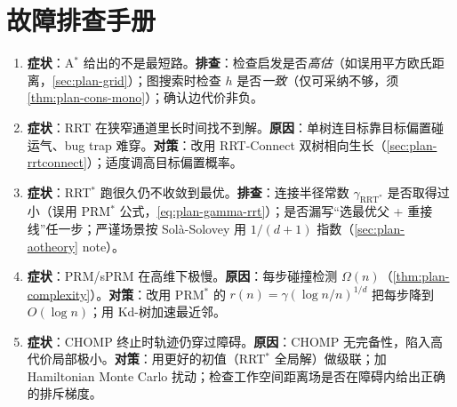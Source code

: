 \section*{故障排查手册}
\begin{enumerate}
  \item \textbf{症状}：A$^*$ 给出的不是最短路。\textbf{排查}：检查启发是否\emph{高估}（如误用平方欧氏距离，\cref{sec:plan-grid}）；图搜索时检查 $h$ 是否\emph{一致}（仅可采纳不够，须 \cref{thm:plan-cons-mono}）；确认边代价非负。
  \item \textbf{症状}：RRT 在狭窄通道里长时间找不到解。\textbf{原因}：单树连目标靠目标偏置碰运气、bug trap 难穿。\textbf{对策}：改用 RRT-Connect 双树相向生长（\cref{sec:plan-rrtconnect}）；适度调高目标偏置概率。
  \item \textbf{症状}：RRT$^*$ 跑很久仍不收敛到最优。\textbf{排查}：连接半径常数 $\gamma_{\mathrm{RRT}^*}$ 是否取得过小（误用 PRM$^*$ 公式，\cref{eq:plan-gamma-rrt}）；是否漏写“选最优父 + 重接线”任一步；严谨场景按 Solà-Solovey 用 $1/(d+1)$ 指数（\cref{sec:plan-aotheory} note）。
  \item \textbf{症状}：PRM/sPRM 在高维下极慢。\textbf{原因}：每步碰撞检测 $\Omega(n)$（\cref{thm:plan-complexity}）。\textbf{对策}：改用 PRM$^*$ 的 $r(n)=\gamma(\log n/n)^{1/d}$ 把每步降到 $O(\log n)$；用 Kd-树加速最近邻。
  \item \textbf{症状}：CHOMP 终止时轨迹仍穿过障碍。\textbf{原因}：CHOMP 无完备性，陷入高代价局部极小。\textbf{对策}：用更好的初值（RRT$^*$ 全局解）做级联；加 Hamiltonian Monte Carlo 扰动；检查工作空间距离场是否在障碍内给出正确的排斥梯度。
\end{enumerate}

